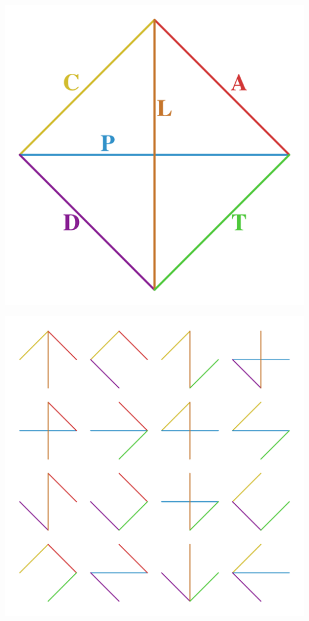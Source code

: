 \documentclass[20pt]{beamer}
\begin{document}

\begin{frame}[plain]
\Large
\begin{center}
\includegraphics[scale=.7]{Figures/n3marked.pdf}
\end{center}
\end{frame}


\begin{frame}[plain]
\Large
\begin{center}
\includegraphics[scale=.7]{Figures/n3MST.pdf}
\end{center}
\end{frame}
\end{document}
